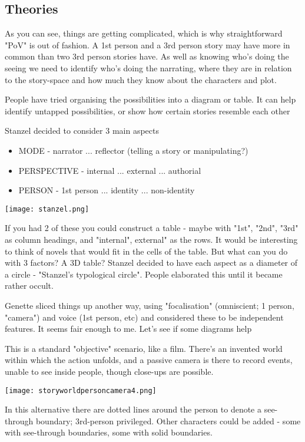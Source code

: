 \documentclass[11pt]{article}
\begin{document}
\subsection*{Theories}
As you can see, things are getting complicated, which is why straightforward "PoV" is out of fashion. A 1st person and a 3rd person story may have more in common than two 3rd person stories have. As well as knowing who's doing the seeing we need to identify who's doing the narrating, where they are in relation to the story-space and how much they know about the characters and plot.

 

People have tried organising the possibilities into a diagram or table. It can help identify untapped possibilities, or show how certain stories resemble each other


Stanzel decided to consider 3 main aspects


\begin{itemize}
\item MODE - narrator ... reflector (telling a story or manipulating?)
\item PERSPECTIVE - internal ... external ... authorial
\item PERSON - 1st person ... identity ... non-identity
\end{itemize}
\texttt{[image: stanzel.png]}

If you had 2 of these you could construct a table - maybe with "1st", "2nd", "3rd" as column headings, and "internal", external" as the rows. It would be interesting to think of novels that would fit in the cells of the table. But what can you do with 3 factors? A 3D table? Stanzel decided to have each aspect as a diameter of a circle - "Stanzel's typological circle". People elaborated this until it became rather occult.



Genette sliced things up another way, using "focalisation" (omniscient; 1 person, "camera") and voice (1st person, etc) and considered these to be independent features. It seems fair enough to me. Let's see if some diagrams help

This is a standard "objective" scenario, like a film. There's an invented world within which the action unfolds, and a passive camera is there to record events, unable to see inside people, though close-ups are possible.

\texttt{[image: storyworldpersoncamera4.png]}

In this alternative there are dotted lines around the person to denote a see-through boundary; 3rd-person privileged. Other characters could be added - some with see-through boundaries, some with solid boundaries.
\end{document}
